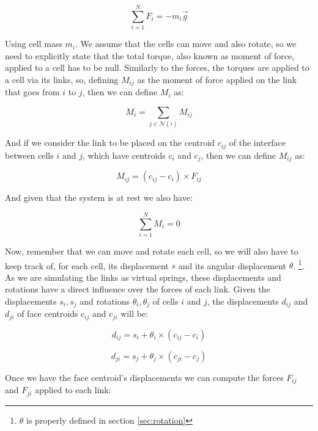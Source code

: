 \begin{equation}
    \sum_{i = 1}^{N} F_i = -m_i\vec{g}
\end{equation}

Using cell mass $m_i$. We assume that the cells can move and also rotate, so we need to 
explicitly state that the total torque, also known as moment of force, applied to a cell has to 
be null. Similarly to the forces, the torques are applied to a cell via its links, 
so, defining $M_{ij}$ as the moment of force applied on the link that goes 
from $i$ to $j$, then we can define $M_i$ as:

\begin{equation}
    M_i =  \sum_{j \in \mathcal{N}(i)} M_{ij}
\end{equation}

And if we consider the link to be placed on the centroid $c_{ij}$ of the interface 
between cells $i$ and $j$, which have centroids $c_i$ and $c_j$, then we can define $M_{ij}$ as:

\begin{equation}
    M_{ij} = (c_{ij} - c_i) \times F_{ij}
\end{equation}

And given that the system is at rest we also have:

\begin{equation}
    \sum_{i = 1}^{N} M_i = 0
\end{equation}

Now, remember that we can move and rotate each cell, so we will also have to keep
track of, for each cell, its displacement $s$ and its angular displacement 
$\theta$.
\footnote{$\theta$ is properly defined in section \ref{sec:rotation}}. 
As we are simulating the links as virtual springs, these displacements and rotations have a direct influence 
over the forces of each link. Given the displacements $s_i, s_j$ and rotations 
$\theta_i, \theta_j$ of cells $i$ and $j$, the displacements $d_{ij}$ and $d_{ji}$ of
face centroids $c_{ij}$ and $c_{ji}$ will be: 

\begin{equation}
    d_{ij} = s_i + \theta_i \times(c_{ij} - c_i) 
\end{equation}

\begin{equation}
    d_{ji} =  s_j + \theta_j \times(c_{ji} - c_j) 
\end{equation}

Once we have the face centroid's displacements  
we can compute the forces $F_{ij}$ and $F_{ji}$ applied to each link:

